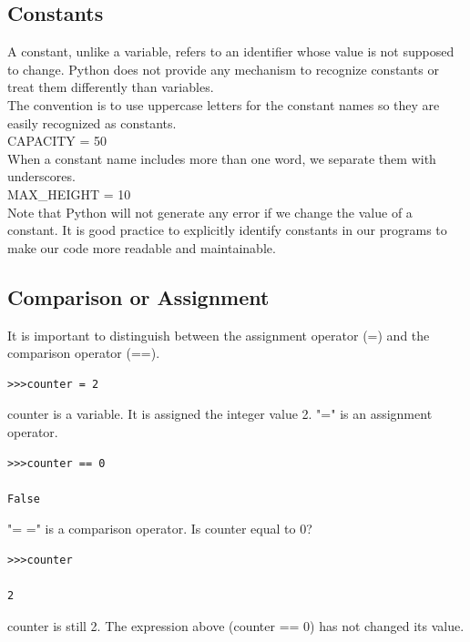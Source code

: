 \documentclass{article}
\begin{document}
\subsection{Constants}
A constant, unlike a variable, refers to an identifier whose value is not supposed to change. Python does not provide any mechanism to recognize constants or treat them differently than variables.\\

The convention is to use uppercase letters for the constant names so they are easily recognized as constants. \\

CAPACITY = 50\\

When a constant name includes more than one word, we separate them with underscores.\\

MAX{\_}HEIGHT = 10\\

Note that Python will not generate any error if we change the value of a constant. It is good practice to explicitly identify constants in our programs to make our code more readable and maintainable.

\subsection{Comparison or Assignment}

It is important to distinguish between the assignment operator (=) and the comparison operator (==).

\begin{lstlisting}
>>>counter = 2
\end{lstlisting}

counter is a variable.  It is assigned the integer value 2.  "="  is an assignment operator. 

\begin{lstlisting}
>>>counter == 0

False
\end{lstlisting}

"= ="  is a comparison operator.  Is counter equal to 0?

\begin{lstlisting}
>>>counter

2
\end{lstlisting}

counter is still 2.  The expression above (counter ==  0) has not changed its value.
\end{document}
